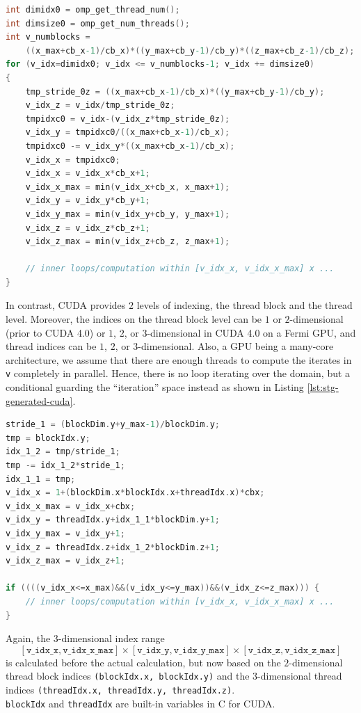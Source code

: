 \begin{lstlisting}[language=C, label=lst:stg-generated-openmp,
	caption={C/OpenMP code generated for a 3D stencil from the Strategy iterator
	``{\lstinline[language=strategy]!for subdomain v(cb) in u(:; t) parallel ...!}''.}]
int dimidx0 = omp_get_thread_num();
int dimsize0 = omp_get_num_threads();
int v_numblocks =
	((x_max+cb_x-1)/cb_x)*((y_max+cb_y-1)/cb_y)*((z_max+cb_z-1)/cb_z);
for (v_idx=dimidx0; v_idx <= v_numblocks-1; v_idx += dimsize0)
{
	tmp_stride_0z = ((x_max+cb_x-1)/cb_x)*((y_max+cb_y-1)/cb_y);
	v_idx_z = v_idx/tmp_stride_0z;
	tmpidxc0 = v_idx-(v_idx_z*tmp_stride_0z);
	v_idx_y = tmpidxc0/((x_max+cb_x-1)/cb_x);
	tmpidxc0 -= v_idx_y*((x_max+cb_x-1)/cb_x);
	v_idx_x = tmpidxc0;
	v_idx_x = v_idx_x*cb_x+1;
	v_idx_x_max = min(v_idx_x+cb_x, x_max+1);
	v_idx_y = v_idx_y*cb_y+1;
	v_idx_y_max = min(v_idx_y+cb_y, y_max+1);
	v_idx_z = v_idx_z*cb_z+1;
	v_idx_z_max = min(v_idx_z+cb_z, z_max+1);

	// inner loops/computation within [v_idx_x, v_idx_x_max] x ...
}
\end{lstlisting}

In contrast, CUDA provides $2$ levels of indexing, the thread block and the thread level.
Moreover, the indices on the thread block level can be $1$ or $2$-dimensional (prior to CUDA 4.0) or
$1$, $2$, or $3$-dimensional in CUDA 4.0 on a Fermi GPU, and thread indices
can be $1$, $2$, or $3$-dimensional.
Also, a GPU being a many-core architecture, we assume that there are enough threads to compute the
iterates in \texttt{v} completely in parallel. Hence, there is no loop iterating over the domain,
but a conditional guarding the ``iteration'' space instead as shown in Listing \ref{lst:stg-generated-cuda}.

\begin{lstlisting}[language=C, label=lst:stg-generated-cuda,
	caption={C for CUDA code generated for a 3D stencil from the Strategy iterator
	``{\lstinline[language=strategy]!for subdomain v(cbx, 1 ...) in u(:; t) parallel ...!}''.}]
stride_1 = (blockDim.y+y_max-1)/blockDim.y;
tmp = blockIdx.y;
idx_1_2 = tmp/stride_1;
tmp -= idx_1_2*stride_1;
idx_1_1 = tmp;
v_idx_x = 1+(blockDim.x*blockIdx.x+threadIdx.x)*cbx;
v_idx_x_max = v_idx_x+cbx;
v_idx_y = threadIdx.y+idx_1_1*blockDim.y+1;
v_idx_y_max = v_idx_y+1;
v_idx_z = threadIdx.z+idx_1_2*blockDim.z+1;
v_idx_z_max = v_idx_z+1;

if ((((v_idx_x<=x_max)&&(v_idx_y<=y_max))&&(v_idx_z<=z_max))) {
	// inner loops/computation within [v_idx_x, v_idx_x_max] x ...
}
\end{lstlisting}
Again, the $3$-dimensional index range
\[
	[\mathtt{v\_idx\_x}, \mathtt{v\_idx\_x\_max}] \times
	[\mathtt{v\_idx\_y}, \mathtt{v\_idx\_y\_max}] \times [\mathtt{v\_idx\_z}, \mathtt{v\_idx\_z\_max}]
\]
is calculated before the actual calculation, but now based on the $2$-dimensional thread block indices
\texttt{(blockIdx.x, blockIdx.y)} and the $3$-dimensional thread indices \texttt{(threadIdx.x, threadIdx.y, threadIdx.z)}.\\
\texttt{blockIdx} and \texttt{threadIdx} are built-in variables in C for CUDA.
